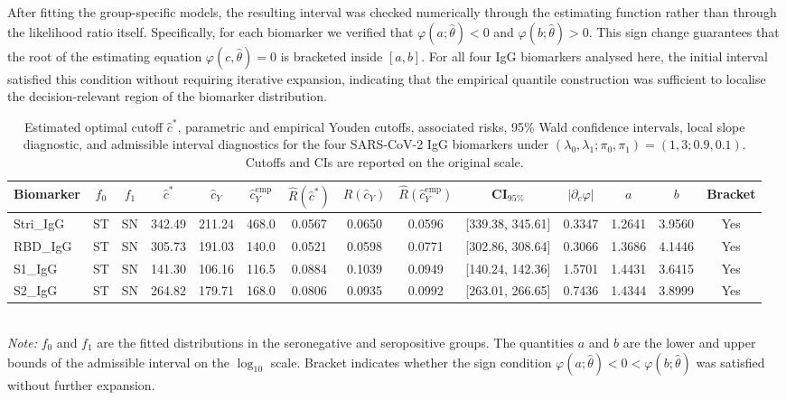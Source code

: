 \documentclass[11pt,a4paper]{article}
\theoremstyle{definition}
\theoremstyle{remark}
\newcommand{\1}{\mathbf{1}}
\begin{document}
After fitting the group-specific models, the
resulting interval was checked numerically through the estimating
function rather than through the likelihood ratio itself. Specifically,
for each biomarker we verified that $\varphi(a;\hat\theta)<0$ and $\varphi(b;\hat\theta)>0.$
This sign change guarantees that the root of the estimating equation
$\varphi(c,\hat\theta)=0$ is bracketed inside $[a,b]$. For all four
IgG biomarkers analysed here, the initial interval satisfied this
condition without requiring iterative expansion, indicating that the
empirical quantile construction was sufficient to localise the
decision-relevant region of the biomarker distribution.

\begin{table}[ht]
\centering
\caption{Estimated optimal cutoff $\hat{c}^*$, parametric and empirical
Youden cutoffs, associated risks, 95\% Wald confidence intervals,
local slope diagnostic, and admissible interval diagnostics for the
four SARS-CoV-2 IgG biomarkers under
$(\lambda_0,\lambda_1;\pi_0,\pi_1) = (1,3;0.9,0.1)$. Cutoffs and
CIs are reported on the original scale.}
\label{tab:real-data-IgG-cutoffs-interval}
\tiny
\setlength{\tabcolsep}{2pt}
\renewcommand{\arraystretch}{1.0}
\begin{tabular}{@{}lccccccccccccc@{}}
\toprule
\textbf{Biomarker} & $f_0$ & $f_1$ & $\hat{c}^*$ & $\hat{c}_Y$ &
  $\hat{c}_Y^\mathrm{emp}$ & $\widehat{R}(\hat{c}^*)$ &
  $\widehat{R}(\hat{c}_Y)$ & $\widehat{R}(\hat{c}_Y^\mathrm{emp})$ &
  CI$_{95\%}$ & $|\partial_c\varphi|$ & $a$ & $b$ & Bracket \\
\midrule
Stri\_IgG & ST & SN & 342.49 & 211.24 & 468.0 & 0.0567 & 0.0650 & 0.0596 & [339.38, 345.61] & 0.3347 & 1.2641 & 3.9560 & Yes \\
RBD\_IgG  & ST & SN & 305.73 & 191.03 & 140.0 & 0.0521 & 0.0598 & 0.0771 & [302.86, 308.64] & 0.3066 & 1.3686 & 4.1446 & Yes \\
S1\_IgG   & ST & SN & 141.30 & 106.16 & 116.5 & 0.0884 & 0.1039 & 0.0949 & [140.24, 142.36] & 1.5701 & 1.4431 & 3.6415 & Yes \\
S2\_IgG   & ST & SN & 264.82 & 179.71 & 168.0 & 0.0806 & 0.0935 & 0.0992 & [263.01, 266.65] & 0.7436 & 1.4344 & 3.8999 & Yes \\
\bottomrule
\end{tabular}
\medskip\\
{\footnotesize\textit{Note:} $f_0$ and $f_1$ are the fitted distributions in the
seronegative and seropositive groups. The quantities $a$ and $b$ are
the lower and upper bounds of the admissible interval on the
$\log_{10}$ scale. Bracket indicates whether the sign condition
$\varphi(a;\hat\theta) < 0 < \varphi(b;\hat\theta)$ was satisfied
without further expansion.}
\end{table}
\end{document}
